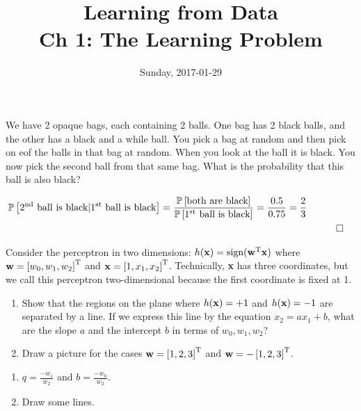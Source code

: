 \documentclass{amsart}
\title{Learning from Data\\
Ch 1: The Learning Problem}
\date{Sunday, 2017-01-29}
\begin{document}
\maketitle

\begin{problem}[1.1]
  We have 2 opaque bags, each containing 2 balls. One bag
  has 2 black balls, and the other has a black and a while ball. You pick a bag
  at random and then pick on eof the balls in that bag at random. When you
  look at the ball it is black. You now pick the second ball from that same bag.
  What is the probability that this ball is also black?
\end{problem}

\begin{solution}
  \begin{align*}
    \mathbb{P}\left[\textup{\(2^{\textup{nd}}\) ball is black} |
      \textup{\(1^{\textup{st}}\) ball is black}\right] =
      \frac{\mathbb{P}\left[\textup{both are black}\right]}
           {\mathbb{P}\left[\textup{\(1^{\textup{st}}\) ball is black}\right]}
      = \frac{0.5}{0.75} = \frac{2}{3} & & \\
      & & &\qed
  \end{align*}
\end{solution}

\begin{problem}[1.2]
  Consider the perceptron in two dimensions: \(h({\bf x}) =
  \textup{sign}({\bf w}^\textup{T}{\bf x})\) where
  \({\bf w} = \left[w_0, w_1, w_2\right]^\textup{T}\) and
  \({\bf x} = \left[1, x_1, x_2\right]^\textup{T}\). Technically, {\bf x} has
  three coordinates, but we call this perceptron two-dimensional because the
  first coordinate is fixed at 1.
  \begin{enumerate}
    \item Show that the regions on the plane where \(h({\bf x}) = +1\) and
      \(h({\bf x}) = -1\) are separated by a line. If we express this line by
      the equation \(x_2 = ax_1 + b\), what are the slope \(a\) and the
      intercept \(b\) in terms of \(w_0, w_1, w_2\)?
    \item Draw a picture for the cases
      \({\bf w} = \left[1,2,3\right]^\textup{T}\) and
      \({\bf w} = -\left[1,2,3\right]^\textup{T}\).
  \end{enumerate}
\end{problem}

\begin{solution}
  \begin{enumerate}
    \item \(q = \frac{-w_1}{w_2}\) and \(b = \frac{-w_0}{w_2}\).
    \item Draw some lines.
  \end{enumerate}
\end{solution}
\end{document}
